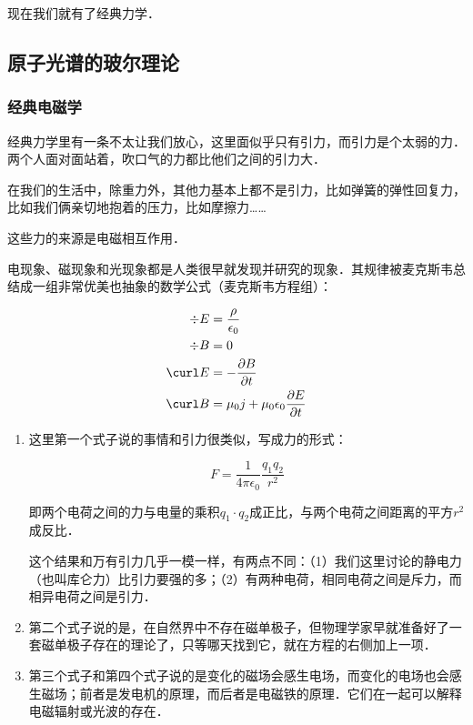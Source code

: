 现在我们就有了经典力学．

\subsection{原子光谱的玻尔理论}

\subsubsection{经典电磁学}

经典力学里有一条不太让我们放心，这里面似乎只有引力，而引力是个太弱的力．两个人面对面站着，吹口气的力都比他们之间的引力大．

在我们的生活中，除重力外，其他力基本上都不是引力，比如弹簧的弹性回复力，比如我们俩亲切地抱着的压力，比如摩擦力……

这些力的来源是电磁相互作用．

电现象、磁现象和光现象都是人类很早就发现并研究的现象．其规律被麦克斯韦总结成一组非常优美也抽象的数学公式（麦克斯韦方程组）：

\begin{equation}
\begin{aligned}
\div E & = \frac{\rho}{ \epsilon_0}\\
\div B & = 0 \\
\curl E & = - \frac{\partial B}{\partial t} \\
\curl B & = \mu_0 j + \mu_0 \epsilon_0 \frac{\partial E}{\partial t}
\end{aligned}
\end{equation}


\begin{enumerate}
\item 

这里第一个式子说的事情和引力很类似，写成力的形式：

\begin{equation}
F = \frac{1}{4 \pi \epsilon_0} \frac{q_1 q_2}{r^2}
\end{equation}

即两个电荷之间的力与电量的乘积$q_1 \cdot q_2$成正比，与两个电荷之间距离的平方$r^2$成反比．

这个结果和万有引力几乎一模一样，有两点不同：（1）我们这里讨论的静电力（也叫库仑力）比引力要强的多；（2）有两种电荷，相同电荷之间是斥力，而相异电荷之间是引力．

\item

第二个式子说的是，在自然界中不存在磁单极子，但物理学家早就准备好了一套磁单极子存在的理论了，只等哪天找到它，就在方程的右侧加上一项．

\item

第三个式子和第四个式子说的是变化的磁场会感生电场，而变化的电场也会感生磁场；前者是发电机的原理，而后者是电磁铁的原理．它们在一起可以解释电磁辐射或光波的存在．

\end{enumerate}

